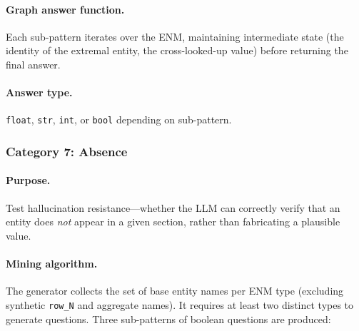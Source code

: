 \documentclass[11pt]{article}
\begin{document}
\paragraph{Graph answer function.}
Each sub-pattern iterates over the ENM, maintaining intermediate state
(the identity of the extremal entity, the cross-looked-up value) before
returning the final answer.

\paragraph{Answer type.} \texttt{float}, \texttt{str}, \texttt{int}, or
\texttt{bool} depending on sub-pattern.

\subsubsection{Category 7: Absence}

\paragraph{Purpose.}  Test hallucination resistance---whether the LLM can
correctly verify that an entity does \emph{not} appear in a given section,
rather than fabricating a plausible value.

\paragraph{Mining algorithm.}
The generator collects the set of base entity names per ENM type
(excluding synthetic \texttt{row\_N} and aggregate names).  It requires at
least two distinct types to generate questions.  Three sub-patterns of
boolean questions are produced:
\end{document}
